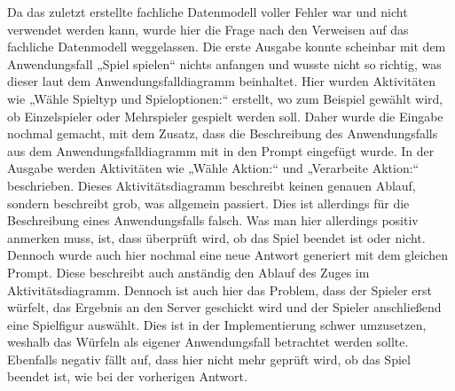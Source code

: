 Da das zuletzt erstellte fachliche Datenmodell voller Fehler war und nicht verwendet werden kann, wurde hier die Frage nach den Verweisen 
auf das fachliche Datenmodell weggelassen. Die erste Ausgabe konnte scheinbar mit dem Anwendungsfall „Spiel spielen“ nichts anfangen und 
wusste nicht so richtig, was dieser laut dem Anwendungsfalldiagramm beinhaltet. Hier wurden Aktivitäten wie „Wähle Spieltyp und Spieloptionen:“ 
erstellt, wo zum Beispiel gewählt wird, ob Einzelspieler oder Mehrspieler gespielt werden soll. Daher wurde die Eingabe nochmal gemacht, 
mit dem Zusatz, dass die Beschreibung des Anwendungsfalls aus dem Anwendungsfalldiagramm mit in den Prompt eingefügt wurde. In der Ausgabe 
werden Aktivitäten wie „Wähle Aktion:“ und „Verarbeite Aktion:“ beschrieben. Dieses Aktivitätsdiagramm beschreibt keinen genauen Ablauf, 
sondern beschreibt grob, was allgemein passiert. Dies ist allerdings für die Beschreibung eines Anwendungsfalls falsch. Was man hier allerdings 
positiv anmerken muss, ist, dass überprüft wird, ob das Spiel beendet ist oder nicht. Dennoch wurde auch hier nochmal eine neue Antwort 
generiert mit dem gleichen Prompt. Diese beschreibt auch anständig den Ablauf des Zuges im Aktivitätsdiagramm. Dennoch ist auch hier das 
Problem, dass der Spieler erst würfelt, das Ergebnis an den Server geschickt wird und der Spieler anschließend eine Spielfigur auswählt. 
Dies ist in der Implementierung schwer umzusetzen, weshalb das Würfeln als eigener Anwendungsfall betrachtet werden sollte. Ebenfalls 
negativ fällt auf, dass hier nicht mehr geprüft wird, ob das Spiel beendet ist, wie bei der vorherigen Antwort.

